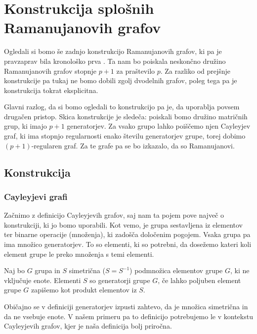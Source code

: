 \section{Konstrukcija splošnih Ramanujanovih grafov}
Ogledali si bomo še zadnjo konstrukcijo Ramanujanovih grafov, ki pa je pravzaprav bila kronološko prva \cite{lps-ramanujan}. Ta nam bo poiskala neskončno družino Ramanujanovih grafov stopnje \(p+1\) za praštevilo \(p\). Za razliko od prejšnje konstrukcije pa tukaj ne bomo dobili zgolj dvodelnih grafov, poleg tega pa je konstrukcija tokrat eksplicitna.

Glavni razlog, da si bomo ogledali to konstrukcijo pa je, da uporablja povsem drugačen pristop. Skica konstrukcije je sledeča: poiskali bomo družino matričnih grup, ki imajo \(p+1\) generatorjev. Za vsako grupo lahko poiščemo njen Cayleyjev graf, ki ima stopnjo regularnosti enako številu generatorjev grupe, torej dobimo \((p+1)\)-regularen graf. Za te grafe pa se bo izkazalo, da so Ramanujanovi.

\subsection{Konstrukcija}
\subsubsection{Cayleyjevi grafi}
Začnimo z definicijo Cayleyjevih grafov, saj nam ta pojem pove največ o konstrukciji, ki jo bomo uporabili. Kot vemo, je grupa sestavljena iz elementov ter binarne operacije (množenja), ki zadošča določenim pogojem. Vsaka grupa pa ima množico generatorjev. To so elementi, ki so potrebni, da dosežemo kateri koli element grupe le preko množenja s temi elementi.

\begin{definicija}[Generatorji]
    Naj bo \(G\) grupa in \(S\) simetrična (\(S=S^{-1}\)) podmnožica elementov grupe \(G\), ki ne vključuje enote. Elementi \(S\) so generatorji grupe \(G\), če lahko poljuben element grupe \(G\) zapišemo kot produkt elementov iz \(S\).
\end{definicija}
Običajno se v definiciji generatorjev izpusti zahtevo, da je množica simetrična in da ne vsebuje enote. V našem primeru pa to definicijo potrebujemo le v kontekstu Cayleyjevih grafov, kjer je naša definicija bolj priročna.

